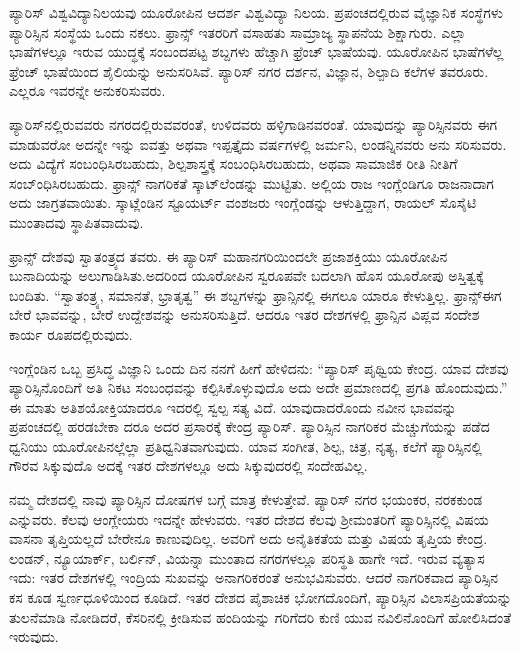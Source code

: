 ಪ್ಯಾರಿಸ್​ ವಿಶ್ವವಿದ್ಯಾನಿಲಯವು ಯೂರೋಪಿನ ಆದರ್ಶ ವಿಶ್ವವಿದ್ಯಾ ನಿಲಯ. ಪ್ರಪಂಚದಲ್ಲಿರುವ ವೈಜ್ಞಾನಿಕ ಸಂಸ್ಥೆಗಳು ಪ್ಯಾರಿಸ್ಸಿನ ಸಂಸ್ಥೆಯ ಒಂದು ನಕಲು. ಫ್ರಾನ್ಸ್​ ಇತರರಿಗೆ ವಸಾಹತು ಸಾಮ್ರಾಜ್ಯ ಸ್ಥಾಪನೆಯ ಶಿಕ್ಷಾಗುರು. ಎಲ್ಲಾ ಭಾಷೆಗಳಲ್ಲೂ ಇರುವ ಯುದ್ಧಕ್ಕೆ ಸಂಬಂದಪಟ್ಟ ಶಬ್ದಗಳು ಹೆಚ್ಚಾಗಿ ಫ್ರೆಂಚ್​ ಭಾಷೆಯವು. ಯೂರೋಪಿನ ಭಾಷೆಗಳೆಲ್ಲ ಫ್ರೆಂಚ್​ ಭಾಷೆಯಿಂದ ಶೈಲಿಯನ್ನು ಅನುಸರಿಸಿವೆ. ಪ್ಯಾರಿಸ್​ ನಗರ ದರ್ಶನ, ವಿಜ್ಞಾನ, ಶಿಲ್ಪಾದಿ ಕಲೆಗಳ ತವರೂರು. ಎಲ್ಲರೂ ಇವರನ್ನೇ ಅನುಕರಿಸುವರು.

ಪ್ಯಾರಿಸ್​ನಲ್ಲಿರುವವರು ನಗರದಲ್ಲಿರುವವರಂತೆ, ಉಳಿದವರು ಹಳ್ಳಿಗಾಡಿನವರಂತೆ. ಯಾವುದನ್ನು ಪ್ಯಾರಿಸ್ಸಿನವರು ಈಗ ಮಾಡುವರೋ ಅದನ್ನೇ ಇನ್ನು ಐವತ್ತು ಅಥವಾ ಇಪ್ಪತ್ತೈದು ವರ್ಷಗಳಲ್ಲಿ ಜರ್ಮನಿ, ಲಂಡನ್ನಿನವರು ಅನು ಸರಿಸುವರು. ಅದು ವಿದ್ಯೆಗೆ ಸಂಬಂಧಿಸಿರಬಹುದು, ಶಿಲ್ಪಶಾಸ್ತ್ರಕ್ಕೆ ಸಂಬಂಧಿಸಿರಬಹುದು, ಅಥವಾ ಸಾಮಾಜಿಕ ರೀತಿ ನೀತಿಗೆ ಸಂಬ್ಂಧಿಸಿರಬಹುದು. ಫ್ರಾನ್ಸ್​ ನಾಗರಿಕತೆ ಸ್ಕಾಟ್​ಲೆಂಡನ್ನು ಮುಟ್ಟಿತು. ಅಲ್ಲಿಯ ರಾಜ ಇಂಗ್ಲೆಂಡಿಗೂ ರಾಜನಾದಾಗ ಅದು ಜಾಗ್ರತವಾಯಿತು. ಸ್ಕಾಟ್ಲೆಂಡಿನ ಸ್ಟೂಯರ್ಟ್ ವಂಶಜರು ಇಂಗ್ಲೆಂಡನ್ನು ಆಳುತ್ತಿದ್ದಾಗ, ರಾಯಲ್​ ಸೊಸೈಟಿ ಮುಂತಾದವು ಸ್ಥಾಪಿತವಾದುವು.

ಫ್ರಾನ್ಸ್​ ದೇಶವು ಸ್ವಾತಂತ್ರ್ಯದ ತವರು. ಈ ಪ್ಯಾರಿಸ್​ ಮಹಾನಗರಿಯಿಂದಲೇ ಪ್ರಜಾಶಕ್ತಿಯು ಯೂರೋಪಿನ ಬುನಾದಿಯನ್ನು ಅಲುಗಾಡಿಸಿತು.ಅದರಿಂದ ಯೂರೋಪಿನ ಸ್ವರೂಪವೇ ಬದಲಾಗಿ ಹೊಸ ಯೂರೋಪು ಅಸ್ತಿತ್ವಕ್ಕೆ ಬಂದಿತು. “ಸ್ವಾತಂತ್ರ್ಯ, ಸಮಾನತೆ, ಭ್ರಾತೃತ್ವ” ಈ ಶಬ್ದಗಳನ್ನು ಫ್ರಾನ್ಸಿನಲ್ಲಿ ಈಗಲೂ ಯಾರೂ ಕೇಳುತ್ತಿಲ್ಲ. ಫ್ರಾನ್ಸ್​ ಈಗ ಬೇರೆ ಭಾವವನ್ನು, ಬೇರೆ ಉದ್ದೇಶವನ್ನು ಅನುಸರಿಸುತ್ತಿದೆ. ಆದರೂ ಇತರ ದೇಶಗಳಲ್ಲಿ ಫ್ರಾನ್ಸಿನ ವಿಪ್ಲವ ಸಂದೇಶ ಕಾರ್ಯ ರೂಪದಲ್ಲಿರುವುದು.

ಇಂಗ್ಲೆಂಡಿನ ಒಬ್ಬ ಪ್ರಸಿದ್ಧ ವಿಜ್ಞಾನಿ ಒಂದು ದಿನ ನನಗೆ ಹೀಗೆ ಹೇಳಿದನು: “ಪ್ಯಾರಿಸ್​ ಪೃಥ್ವಿಯ ಕೇಂದ್ರ. ಯಾವ ದೇಶವು ಪ್ಯಾರಿಸ್ಸಿನೊಂದಿಗೆ ಅತಿ ನಿಕಟ ಸಂಬಂಧವನ್ನು ಕಲ್ಪಿಸಿಕೊಳ್ಳುವುದೊ ಅದು ಅದೇ ಪ್ರಮಾಣದಲ್ಲಿ ಪ್ರಗತಿ ಹೊಂದುವುದು.” ಈ ಮಾತು ಅತಿಶಯೋಕ್ತಿಯಾದರೂ ಇದರಲ್ಲಿ ಸ್ವಲ್ಪ ಸತ್ಯ ವಿದೆ. ಯಾವುದಾದರೊಂದು ನವೀನ ಭಾವವನ್ನು ಪ್ರಪಂಚದಲ್ಲಿ ಹರಡಬೇಕಾ ದರೂ ಅದರ ಪ್ರಸಾರಕ್ಕೆ ಕೇಂದ್ರ ಪ್ಯಾರಿಸ್​. ಪ್ಯಾರಿಸ್ಸಿನ ನಾಗರಿಕರ ಮೆಚ್ಚುಗೆಯನ್ನು ಪಡೆದ ಧ್ವನಿಯು ಯೂರೋಪಿನಲ್ಲೆಲ್ಲಾ ಪ್ರತಿಧ್ವನಿತವಾಗುವುದು. ಯಾವ ಸಂಗೀತ, ಶಿಲ್ಪ, ಚಿತ್ರ, ನೃತ್ಯ, ಕಲೆಗೆ ಪ್ಯಾರಿಸ್ಸಿನಲ್ಲಿ ಗೌರವ ಸಿಕ್ಕುವುದೊ ಅದಕ್ಕೆ ಇತರ ದೇಶಗಳಲ್ಲೂ ಅದು ಸಿಕ್ಕುವುದರಲ್ಲಿ ಸಂದೇಹವಿಲ್ಲ.

ನಮ್ಮ ದೇಶದಲ್ಲಿ ನಾವು ಪ್ಯಾರಿಸ್ಸಿನ ದೋಷಗಳ ಬಗ್ಗೆ ಮಾತ್ರ ಕೇಳುತ್ತೇವೆ. ಪ್ಯಾರಿಸ್​ ನಗರ ಭಯಂಕರ, ನರಕಕುಂಡ ಎನ್ನುವರು. ಕೆಲವು ಆಂಗ್ಲೇಯರು ಇದನ್ನೇ ಹೇಳುವರು. ಇತರ ದೇಶದ ಕೆಲವು ಶ‍್ರೀಮಂತರಿಗೆ ಪ್ಯಾರಿಸ್ಸಿನಲ್ಲಿ ವಿಷಯ ವಾಸನಾ ತೃಪ್ತಿಯಲ್ಲದೆ ಬೇರೇನೂ ಕಾಣುವುದಿಲ್ಲ. ಅವರಿಗೆ ಅದು ಅನೈತಿಕತೆಯ ಮತ್ತು ವಿಷಯ ತೃಪ್ತಿಯ ಕೇಂದ್ರ. ಲಂಡನ್​, ನ್ಯೂಯಾರ್ಕ್​, ಬರ್ಲಿನ್​, ವಿಯನ್ನಾ ಮುಂತಾದ ನಗರಗಳಲ್ಲೂ ಪರಿಸ್ಥತಿ ಹಾಗೇ ಇದೆ. ಇರುವ ವ್ಯತ್ಯಾಸ ಇದು: ಇತರ ದೇಶಗಳಲ್ಲಿ ಇಂದ್ರಿಯ ಸುಖವನ್ನು ಅನಾಗರಿಕರಂತೆ ಅನುಭವಿಸುವರು. ಆದರೆ ನಾಗರಿಕವಾದ ಪ್ಯಾರಿಸ್ಸಿನ ಕಸ ಕೂಡ ಸ್ವರ್ಣಧೂಳಿಯಿಂದ ಕೂಡಿದೆ. ಇತರ ದೇಶದ ಪೈಶಾಚಿಕ ಭೋಗದೊಂದಿಗೆ, ಪ್ಯಾರಿಸ್ಸಿನ ವಿಲಾಸಪ್ರಿಯತೆಯನ್ನು ತುಲನೆಮಾಡಿ ನೋಡಿದರೆ, ಕೆಸರಿನಲ್ಲಿ ಕ್ರೀಡಿಸುವ ಹಂದಿಯನ್ನು ಗರಿಗೆದರಿ ಕುಣಿ ಯುವ ನವಿಲಿನೊಂದಿಗೆ ಹೋಲಿಸಿದಂತೆ ಇರುವುದು.

